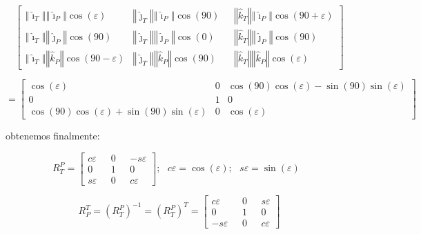 \begin{equation*}
\left[ 
\begin{array}{ccc}
\left\Vert \hat{\imath}_{T}\right\Vert \left\Vert \hat{\imath}%
_{P}\right\Vert \cos (\varepsilon )\text{ \ \ \ \ \ \ \ \ \ \ \ } & 
\left\Vert \hat{\jmath}_{T}\right\Vert \left\Vert \hat{\imath}%
_{P}\right\Vert \cos (90)\text{ \ \ } & \left\Vert \hat{k}%
_{T}\right\Vert \left\Vert \hat{\imath}_{P}\right\Vert \cos (90+\varepsilon )
\\ 
\left\Vert \hat{\imath}_{T}\right\Vert \left\Vert \hat{\jmath}%
_{P}\right\Vert \cos (90)\text{ \ \ \ \ \ \ \ \ } & \left\Vert \hat{\jmath}%
_{T}\right\Vert \left\Vert \hat{\jmath}_{P}\right\Vert \cos (0)\text{ \ \ \ }
& \left\Vert \hat{k}_{T}\right\Vert \left\Vert \hat{\jmath}%
_{P}\right\Vert \cos (90)\text{ \ \ \ \ } \\ 
\left\Vert \hat{\imath}_{T}\right\Vert \left\Vert \hat{k}_{P}\right\Vert
\cos (90-\varepsilon ) & \left\Vert \hat{\jmath}_{T}\right\Vert \left\Vert 
\hat{k}_{P}\right\Vert \cos (90) & \left\Vert \hat{k}_{T}\right\Vert
\left\Vert \hat{k}_{P}\right\Vert \cos (\varepsilon )\text{ \ \ \ \ }%
\end{array}%
\right]
\end{equation*}

\begin{equation*}
=\left[ 
\begin{array}{ccc}
\cos (\varepsilon ) & 0 & \cos (90)\cos (\varepsilon )-\sin (90)\sin
(\varepsilon ) \\ 
0 & 1 & 0 \\ 
\cos (90)\cos (\varepsilon )+\sin (90)\sin (\varepsilon ) & 0 & \cos
(\varepsilon )%
\end{array}%
\right]
\end{equation*}

obtenemos finalmente:

\begin{equation}
R_{T}^{P}=\left[ 
\begin{array}{ccc}
c\varepsilon & 0 & -s\varepsilon \\ 
0 & 1 & 0 \\ 
s\varepsilon \text{\ \ \ } & 0\text{\ \ } & c\varepsilon%
\end{array}%
\right] ;\text{ \ \ \ \ }c\varepsilon =\cos (\varepsilon );\text{ }%
s\varepsilon =\sin (\varepsilon )\text{\ \ }
\label{eq:R_P_T}
\end{equation}

\begin{equation}
R_{P}^{T}=\left( R_{T}^{P}\right) ^{-1}=\left( R_{T}^{P}\right) ^{T}=\left[ 
\begin{array}{ccc}
c\varepsilon & 0 & s\varepsilon \\ 
0 & 1 & 0 \\ 
-s\varepsilon \text{\ \ \ } & 0\text{\ \ } & c\varepsilon%
\end{array}%
\right]
\label{eq:R_T_P}
\end{equation}

